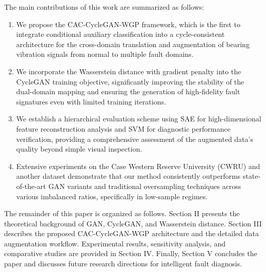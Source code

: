 The main contributions of this work are summarized as follows:
\begin{enumerate}
    \item We propose the CAC-CycleGAN-WGP framework, which is the first to integrate conditional auxiliary classification into a cycle-consistent architecture for the cross-domain translation and augmentation of bearing vibration signals from normal to multiple fault domains.
    \item We incorporate the Wasserstein distance with gradient penalty into the CycleGAN training objective, significantly improving the stability of the dual-domain mapping and ensuring the generation of high-fidelity fault signatures even with limited training iterations.
    \item We establish a hierarchical evaluation scheme using SAE for high-dimensional feature reconstruction analysis and SVM for diagnostic performance verification, providing a comprehensive assessment of the augmented data's quality beyond simple visual inspection.
    \item Extensive experiments on the Case Western Reserve University (CWRU) and another dataset demonstrate that our method consistently outperforms state-of-the-art GAN variants and traditional oversampling techniques across various imbalanced ratios, specifically in low-sample regimes.
\end{enumerate}

The remainder of this paper is organized as follows. Section II presents the theoretical background of GAN, CycleGAN, and Wasserstein distance. Section III describes the proposed CAC-CycleGAN-WGP architecture and the detailed data augmentation workflow. Experimental results, sensitivity analysis, and comparative studies are provided in Section IV. Finally, Section V concludes the paper and discusses future research directions for intelligent fault diagnosis.
